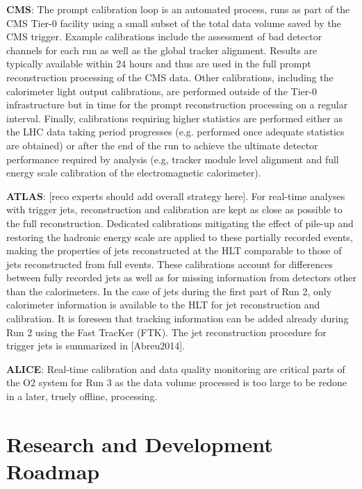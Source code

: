 \vskip 0.5cm
\noindent
{\bf CMS}: The prompt calibration loop is an automated process, runs as part of the CMS Tier-0 facility using a small subset of the total data volume saved by the CMS trigger. Example calibrations include the assessment of bad detector channels for each run as well as the global tracker alignment. Results are typically available within 24 hours and thus are used in the full prompt reconstruction processing of the CMS data. Other calibrations, including the calorimeter light output calibrations, are performed outside of the Tier-0 infrastructure but in time for the prompt reconstruction processing on a regular interval. Finally, calibrations requiring higher statistics are performed either as the LHC data taking period progresses (e.g. performed once adequate statistics are obtained) or after the end of the run to achieve the ultimate detector performance required by analysis (e.g, tracker module level alignment and full energy scale calibration of the electromagnetic calorimeter). 

\vskip 0.5cm
\noindent
{\bf ATLAS}: [reco experts should add overall strategy here]. For real-time analyses with trigger jets, reconstruction and calibration are  kept as close as possible to the full reconstruction. Dedicated calibrations mitigating the effect of pile-up and restoring the hadronic energy scale are applied to these partially recorded events, making the properties of jets reconstructed at the HLT comparable to those of jets reconstructed from full events. These calibrations account for differences between fully recorded jets as well as for missing information from detectors other than the calorimeters. In the case of jets during the first part of Run 2, only calorimeter information is available to the HLT for jet reconstruction and calibration. It is foreseen that tracking information can be added already during Run 2 using the Fast TracKer (FTK). The jet reconstruction procedure for trigger jets is summarized in [Abreu2014]. 

\vskip 0.5cm
\noindent
{\bf ALICE}: Real-time calibration and data quality monitoring are critical parts of the O2 system for Run 3 as the data volume processed is too large to be redone in a later, truely offline, processing.

\section{Research and Development Roadmap}

